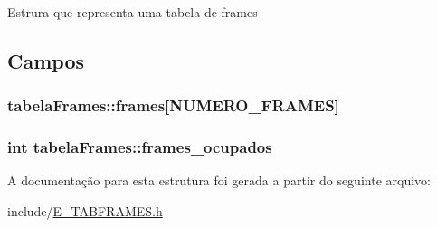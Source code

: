 Estrura que representa uma tabela de frames 

\subsection{Campos}
\hypertarget{structtabela_frames_aac0c8dc35d3f4adf6ea85a58e6dd5b1b}{}
\subsubsection[{frames}]{ tabela\+Frames\+::frames\mbox{[}{\bf N\+U\+M\+E\+R\+O\+\_\+\+F\+R\+A\+M\+E\+S}\mbox{]}}\label{structtabela_frames_aac0c8dc35d3f4adf6ea85a58e6dd5b1b}
\hypertarget{structtabela_frames_a553bdd652583501262efcc7ecdea074a}{}
\subsubsection[{frames\+\_\+ocupados}]{\setlength{\rightskip}{0pt plus 5cm}int tabela\+Frames\+::frames\+\_\+ocupados}\label{structtabela_frames_a553bdd652583501262efcc7ecdea074a}


A documentação para esta estrutura foi gerada a partir do seguinte arquivo\+:\begin{DoxyCompactItemize}
\item 
include/\hyperlink{_e___t_a_b_f_r_a_m_e_s_8h}{E\+\_\+\+T\+A\+B\+F\+R\+A\+M\+E\+S.\+h}\end{DoxyCompactItemize}
